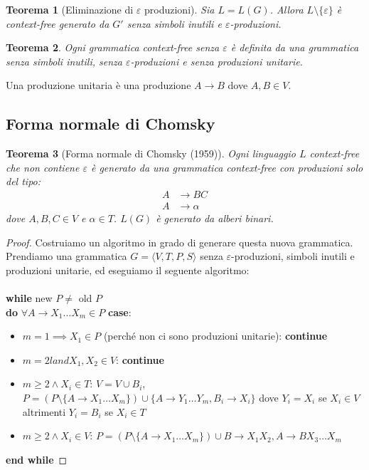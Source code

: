 \documentclass[a4paper,titlepage]{article}
\newtheorem{theorem}{Teorema}[section]
\theoremstyle{definition}
\begin{document}
\begin{theorem}[Eliminazione di $\varepsilon$ produzioni]
	Sia $L=L(G)$. Allora $L\setminus\{\varepsilon\}$ è context-free generato da $G'$ senza simboli inutili e $\varepsilon$-produzioni. 
\end{theorem}
\begin{theorem}
	Ogni grammatica context-free senza $\varepsilon$ è definita da una grammatica senza simboli inutili, senza $\varepsilon$-produzioni e senza produzioni unitarie. 
\end{theorem}

Una produzione unitaria è una produzione $A\rightarrow B$ dove $A, B\in V$.

\subsection{Forma normale di Chomsky}
\begin{theorem}[Forma normale di Chomsky (1959)]
	Ogni linguaggio $L$ context-free che non contiene $\varepsilon$ è generato da una grammatica context-free con produzioni solo del tipo:
	\[
		\begin{aligned}
			A&\rightarrow BC\\
			A&\rightarrow\alpha
		\end{aligned}
	\]
	 dove $A,B,C\in V$ e $\alpha\in T$. $L(G)$  è generato da alberi binari.
\end{theorem}
\begin{proof}
	Costruiamo un algoritmo in grado di generare questa nuova grammatica. Prendiamo una grammatica $G=\langle V,T,P,S\rangle$ senza $\varepsilon$-produzioni, simboli inutili e produzioni unitarie, ed eseguiamo il seguente algoritmo: \\\\
	\textbf{while} new $P\neq$ old $P$ \\
	\textbf{do} $\forall A\rightarrow X_1 \dots X_m \in P$ \textbf{case}:
	\begin{itemize}
		\item $m=1\implies X_1\in P$ (perché non ci sono produzioni unitarie): \textbf{continue}
		\item $m=2 land X_1,X_2\in V$: \textbf{continue}
		\item $m\geq 2\land X_i\in T$: $V=V\cup{B_i}$, $P=(P\setminus\{A\rightarrow X_1\dots X_m\})\cup\{A\rightarrow Y_1 \ldots Y_m,B_i\rightarrow X_i\}$ dove $Y_i = X_i$ se $X_i \in V$ altrimenti $Y_i = B_i$ se $X_i\in T$
		\item $m\geq 2\land X_i\in V$: $P=(P\setminus\{A\rightarrow X_1\dots X_m\})\cup{B\rightarrow X_1 X_2, A\rightarrow B X_3\dots X_m}$
	\end{itemize}
	\textbf{end while}
\end{proof}
\end{document}
